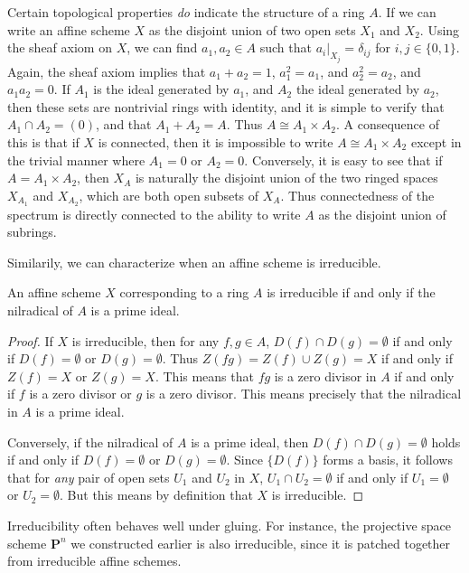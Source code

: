 Certain topological properties \emph{do} indicate the structure of a ring $A$. If we can write an affine scheme $X$ as the disjoint union of two open sets $X_1$ and $X_2$. Using the sheaf axiom on $X$, we can find $a_1,a_2 \in A$ such that $a_i|_{X_j} = \delta_{ij}$ for $i,j \in \{ 0, 1 \}$. Again, the sheaf axiom implies that $a_1 + a_2 = 1$, $a_1^2 = a_1$, and $a_2^2 = a_2$, and $a_1a_2 = 0$. If $A_1$ is the ideal generated by $a_1$, and $A_2$ the ideal generated by $a_2$, then these sets are nontrivial rings with identity, and it is simple to verify that $A_1 \cap A_2 = (0)$, and that $A_1 + A_2 = A$. Thus $A \cong A_1 \times A_2$. A consequence of this is that if $X$ is connected, then it is impossible to write $A \cong A_1 \times A_2$ except in the trivial manner where $A_1 = 0$ or $A_2 = 0$. Conversely, it is easy to see that if $A = A_1 \times A_2$, then $X_A$ is naturally the disjoint union of the two ringed spaces $X_{A_1}$ and $X_{A_2}$, which are both open subsets of $X_A$. Thus connectedness of the spectrum is directly connected to the ability to write $A$ as the disjoint union of subrings.

Similarily, we can characterize when an affine scheme is irreducible.

\begin{lemma}
    An affine scheme $X$ corresponding to a ring $A$ is irreducible if and only if the nilradical of $A$ is a prime ideal.
\end{lemma}
\begin{proof}
    If $X$ is irreducible, then for any $f,g \in A$, $D(f) \cap D(g) = \emptyset$ if and only if $D(f) = \emptyset$ or $D(g) = \emptyset$. Thus $Z(fg) = Z(f) \cup Z(g) = X$ if and only if $Z(f) = X$ or $Z(g) = X$. This means that $fg$ is a zero divisor in $A$ if and only if $f$ is a zero divisor or $g$ is a zero divisor. This means precisely that the nilradical in $A$ is a prime ideal.

    Conversely, if the nilradical of $A$ is a prime ideal, then $D(f) \cap D(g) = \emptyset$ holds if and only if $D(f) = \emptyset$ or $D(g) = \emptyset$. Since $\{ D(f) \}$ forms a basis, it follows that for \emph{any} pair of open sets $U_1$ and $U_2$ in $X$, $U_1 \cap U_2 = \emptyset$ if and only if $U_1 = \emptyset$ or $U_2 = \emptyset$. But this means by definition that $X$ is irreducible.
\end{proof}

Irreducibility often behaves well under gluing. For instance, the projective space scheme $\mathbf{P}^n$ we constructed earlier is also irreducible, since it is patched together from irreducible affine schemes.

